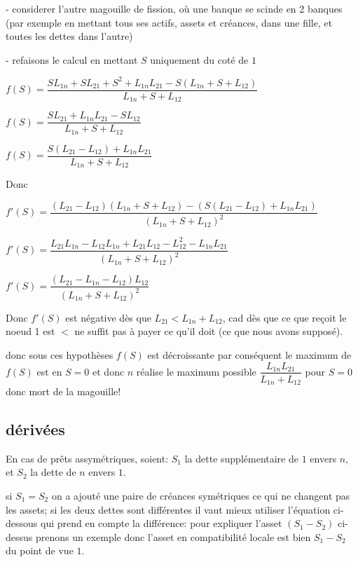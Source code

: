 \documentclass[11pt,oneside,twocolumn]{article}
\begin{document}
- considerer l'autre magouille de fission, où une banque se scinde en 2 banques (par exemple en mettant tous ses actifs, assets et créances, dans une fille, et toutes les dettes dans l'autre)

- refaisons le calcul en mettant $S$ uniquement du coté de $1$


$f(S) =
\dfrac
{SL_{1n}+SL_{21}+S^{2}+L_{1n}L_{21} - S(L_{1n}+S+L_{12})}
{L_{1n}+S+L_{12}}
$

$f(S) =
\dfrac
{SL_{21}+L_{1n}L_{21} - SL_{12}}
{L_{1n}+S+L_{12}}
$

$f(S) = 
\dfrac
{S(L_{21} - L_{12})+L_{1n}L_{21}}
{L_{1n}+S+L_{12}}
$

Donc 


$f'(S) = 
\dfrac
{(L_{21} - L_{12})(L_{1n}+S+L_{12}) - (S(L_{21} - L_{12})+L_{1n}L_{21})}
{(L_{1n}+S+L_{12})^{2}}
$

$f'(S) = 
\dfrac
{L_{21}L_{1n} - L_{12}L_{1n} + L_{21}L_{12} - L_{12}^{2} - L_{1n}L_{21}}
{(L_{1n}+S+L_{12})^{2}}
$

$f'(S) = 
\dfrac
{(L_{21} - L_{1n} - L_{12})L_{12}}
{(L_{1n}+S+L_{12})^{2}}
$


Donc $f'(S)$ est négative dès que $L_{21} <  L_{1n} + L_{12}$,
cad dès que ce que reçoit le noeud 1 est $<$ ne suffit pas à 
payer ce qu'il doit (ce que nous avons supposé).

donc sous ces hypothèses $f(S)$ est décroissante par conséquent le maximum de $f(S)$ est en $S = 0$ et donc $n$ réalise le maximum possible
$\dfrac
{L_{1n}L_{21}}
{L_{1n}+L_{12}}
$
pour $S=0$ donc mort de la magouille!


\subsection{dérivées}

En cas de prêts assymétriques, soient: 
$S_{1}$ la dette supplémentaire de $1$ envers $n$, et 
$S_{2}$ la dette de $n$ envers $1$.

si $S_1=S_2$ on a ajouté une paire de créances symétriques ce qui ne changent pas les assets; si les deux dettes sont différentes il vaut mieux utiliser l'équation ci-dessous qui prend en compte la différence:
pour expliquer l'asset $(S_{1}-S_2)$ ci-dessus
prenons un exemple
donc l'asset en compatibilité locale est bien $S_1-S_2$ du point de vue $1$.
\end{document}
